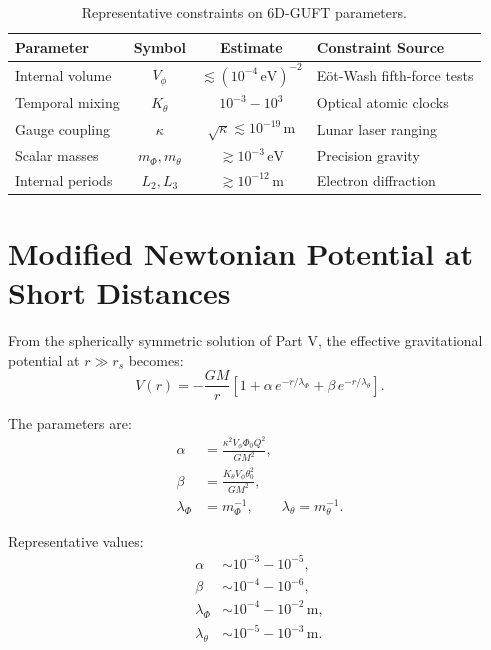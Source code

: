 \documentclass[12pt]{article}
\begin{document}
\begin{table}[h]
\centering
\caption{Representative constraints on 6D-GUFT parameters.}
\begin{tabular}{p{4cm}ccl}
\toprule
\textbf{Parameter} & \textbf{Symbol} & \textbf{Estimate} & \textbf{Constraint Source} \\
\midrule
Internal volume & \(V_\phi\) & \(\lesssim (10^{-4}\,\mathrm{eV})^{-2}\) & Eöt-Wash fifth-force tests \\
Temporal mixing & \(K_\theta\) & \(10^{-3} - 10^3\) & Optical atomic clocks \\
Gauge coupling & \(\kappa\) & \(\sqrt{\kappa}\lesssim 10^{-19}\,\mathrm{m}\) & Lunar laser ranging \\
Scalar masses & \(m_\Phi, m_\theta\) & \(\gtrsim 10^{-3}\,\mathrm{eV}\) & Precision gravity \\
Internal periods & \(L_2,L_3\) & \(\gtrsim 10^{-12}\,\mathrm{m}\) & Electron diffraction \\
\bottomrule
\end{tabular}
\label{tab:parambounds}
\end{table}


\newpage
\section{Modified Newtonian Potential at Short Distances}

From the spherically symmetric solution of Part V, the effective gravitational
potential at \(r \gg r_s\) becomes:
\begin{equation}
V(r)
=
-\frac{GM}{r}
\left[
1 
+ \alpha\,e^{-r/\lambda_\Phi}
+ \beta\, e^{-r/\lambda_\theta}
\right].
\end{equation}

The parameters are:
\begin{align}
\alpha 
&=
\frac{\kappa^2 V_\phi \Phi_0 Q^2}{G M^2},
\\
\beta
&=
\frac{K_\theta V_\phi \theta_0^2}{GM^2},
\\
\lambda_\Phi &= m_\Phi^{-1}, \qquad
\lambda_\theta = m_\theta^{-1}.
\end{align}

Representative values:
\begin{align}
\alpha &\sim 10^{-3} - 10^{-5}, \\
\beta  &\sim 10^{-4} - 10^{-6}, \\
\lambda_\Phi &\sim 10^{-4} - 10^{-2}\,\mathrm{m}, \\
\lambda_\theta &\sim 10^{-5} - 10^{-3}\,\mathrm{m}.
\end{align}
\end{document}
